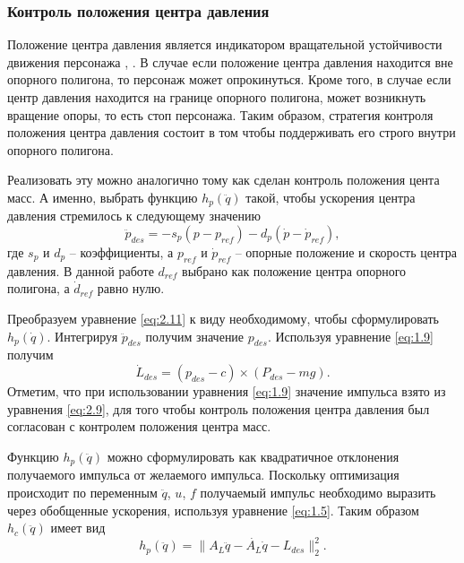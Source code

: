\subsubsection{Контроль положения центра давления}

Положение центра давления является индикатором вращательной устойчивости движения персонажа \cite{MacchiettoZS}, \cite{GoswamiK}. В случае если положение центра давления находится вне опорного полигона, то персонаж может опрокинуться. Кроме того, в случае если центр давления находится на границе опорного полигона, может возникнуть вращение опоры, то есть стоп персонажа. Таким образом, стратегия контроля положения центра давления состоит в том чтобы поддерживать его строго внутри опорного полигона.

Реализовать эту можно аналогично тому как сделан контроль положения цента масс. А именно, выбрать функцию $h_{p}(\ddot{q})$ такой, чтобы ускорения центра давления стремилось к следующему значению
\begin{equation*}
  \ddot{p}_{des} = - s_{p} (p - p_{ref}) - d_{p} (\dot{p} - \dot{p}_{ref}), \tag{2.11}\label{eq:2.11}
\end{equation*}
где $s_{p}$ и $d_{p}$ -- коэффициенты, а $p_{ref}$ и $\dot{p}_{ref}$ -- опорные положение и скорость центра давления. В данной работе $d_{ref}$ выбрано как положение центра опорного полигона, а $\dot{d}_{ref}$ равно нулю.

Преобразуем уравнение \ref{eq:2.11} к виду необходимому, чтобы сформулировать $h_p(\dot{q})$. Интегрируя $\ddot{p}_{des}$ получим значение $p_{des}$. Используя уравнение \ref{eq:1.9} получим
\begin{equation*}
  \dot{L}_{des} = (p_{des} - c) \times (P_{des} - mg). \tag{2.12}\label{eq:2.12}
\end{equation*}
Отметим, что при использовании уравнения \ref{eq:1.9} значение импульса взято из уравнения \ref{eq:2.9}, для того чтобы контроль положения центра давления был согласован с контролем положения центра масс.

Функцию $h_{p}(\ddot{q})$ можно сформулировать как квадратичное отклонения получаемого импульса от желаемого импульса. Поскольку оптимизация происходит по переменным $\ddot{q}$, $u$, $f$ получаемый импульс необходимо выразить через обобщенные ускорения, используя уравнение \ref{eq:1.5}. Таким образом $h_c(\ddot{q})$ имеет вид
\begin{equation*}
  h_{p}(\ddot{q}) = \lVert A_{L}\ddot{q} - \dot{A_{L}} \dot{q} - L_{des} \rVert_{2}^{2}. \tag{2.13}\label{eq:2.13}
\end{equation*}

